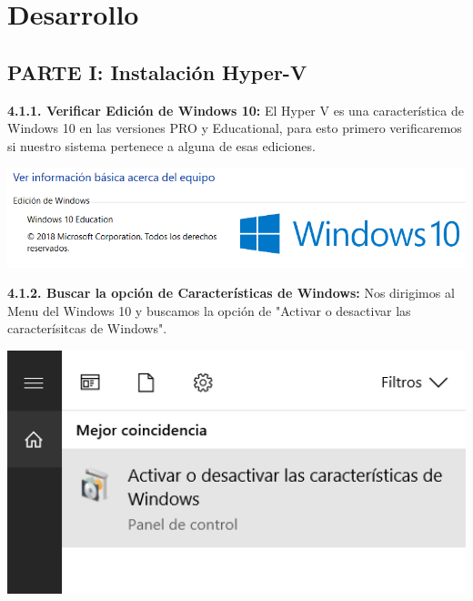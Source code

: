 \section{Desarrollo}

\subsection{PARTE I: Instalación Hyper-V}

\textbf {4.1.1. Verificar Edición de Windows 10:} El Hyper V es una característica de Windows 10 en las versiones PRO y Educational, para esto primero verificaremos si nuestro sistema pertenece a alguna de esas ediciones.
\begin{center}
  \includegraphics[width=15cm]{Imagenes/Windows_Education.png}
\end{center}

\textbf {4.1.2. Buscar la opción de Características de Windows:} Nos dirigimos al Menu del Windows 10 y buscamos la opción de "Activar o desactivar las caracterísitcas de Windows".\\
\begin{center}
  \includegraphics[width=15cm]{Imagenes/Activar_Caracteristicas.png}
\end{center}
\break

